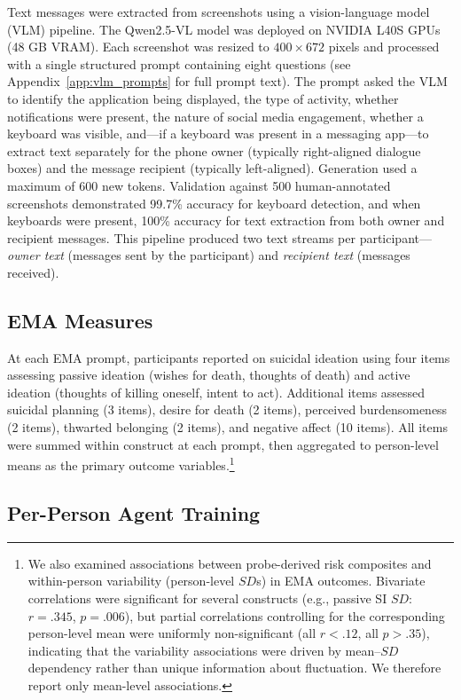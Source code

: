 \documentclass[review,12pt,authoryear]{elsarticle}
\begin{document}
Text messages were extracted from screenshots using a vision-language model (VLM) pipeline. The Qwen2.5-VL model \citep{qwen2025qwen3} was deployed on NVIDIA L40S GPUs (48 GB VRAM). Each screenshot was resized to $400 \times 672$ pixels and processed with a single structured prompt containing eight questions (see Appendix~\ref{app:vlm_prompts} for full prompt text). The prompt asked the VLM to identify the application being displayed, the type of activity, whether notifications were present, the nature of social media engagement, whether a keyboard was visible, and---if a keyboard was present in a messaging app---to extract text separately for the phone owner (typically right-aligned dialogue boxes) and the message recipient (typically left-aligned). Generation used a maximum of 600 new tokens. Validation against 500 human-annotated screenshots demonstrated 99.7\% accuracy for keyboard detection, and when keyboards were present, 100\% accuracy for text extraction from both owner and recipient messages. This pipeline produced two text streams per participant---\textit{owner text} (messages sent by the participant) and \textit{recipient text} (messages received).

\subsection{EMA Measures}

At each EMA prompt, participants reported on suicidal ideation using four items assessing passive ideation (wishes for death, thoughts of death) and active ideation (thoughts of killing oneself, intent to act). Additional items assessed suicidal planning (3 items), desire for death (2 items), perceived burdensomeness (2 items), thwarted belonging (2 items), and negative affect (10 items). All items were summed within construct at each prompt, then aggregated to person-level means as the primary outcome variables.\footnote{We also examined associations between probe-derived risk composites and within-person variability (person-level $SD$s) in EMA outcomes. Bivariate correlations were significant for several constructs (e.g., passive SI $SD$: $r = .345$, $p = .006$), but partial correlations controlling for the corresponding person-level mean were uniformly non-significant (all $r < .12$, all $p > .35$), indicating that the variability associations were driven by mean--$SD$ dependency rather than unique information about fluctuation. We therefore report only mean-level associations.}

\subsection{Per-Person Agent Training}
\end{document}
